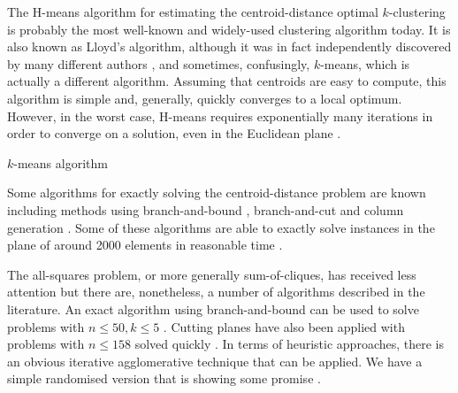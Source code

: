 \documentclass[a4paper]{report}
\newcommand{\clus}{\mathcal{C}}
\begin{document}
The H-means algorithm for estimating the centroid-distance optimal
$k$-clustering is probably the most well-known and widely-used clustering
algorithm today.  It is also known as Lloyd's algorithm, although it was in
fact independently discovered by many different authors \citep{jain2010data},
and sometimes, confusingly, $k$-means, which is actually a different
algorithm.  Assuming that centroids are easy to compute, this algorithm is
simple and, generally, quickly converges to a local optimum.  However, in the
worst case, H-means requires exponentially many iterations in order to
converge on a solution, even in the Euclidean plane
\citep{vattani2009exponential}.

\begin{algorithm}
  \caption{$k$-means algorithm}
  \label{alg:k-means}

\end{algorithm}



Some algorithms for exactly solving the centroid-distance problem are known
including methods using branch-and-bound \citep{brusco2006repetitive},
branch-and-cut \citep{aloise09exact} and column generation
\citep{merle1999interior}.  Some of these algorithms are able to exactly solve
instances in the plane of around 2000 elements in reasonable time
\citep{aloise09exact}.

The all-squares problem, or more generally sum-of-cliques, has received less
attention but there are, nonetheless, a number of algorithms described in the
literature.  An exact algorithm using branch-and-bound
\citep{klein1991optimal} can be used to solve problems with $n , k $ \citep{hansen1997mathprog}.  Cutting planes have also been applied with
problems with $n $ solved quickly
\citep{hansen1997mathprog,palubeckis1997branch}.  In terms of heuristic
approaches, there is an obvious iterative agglomerative technique that can be
applied.  We have a simple randomised version that is showing some promise
\citep{gk2012agglomerative}.
\end{document}
